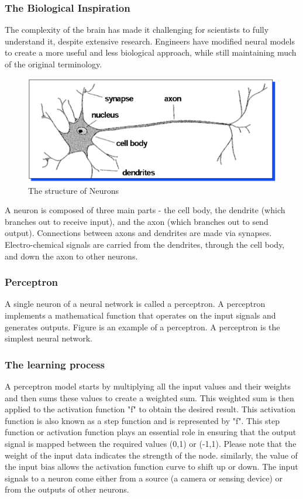 \subsubsection{The Biological Inspiration}
The complexity of the brain has made it challenging for scientists to fully understand it, despite extensive research. Engineers have modified neural models to create a more useful and less biological approach, while still maintaining much of the original terminology.
\begin{figure}[H]
    \centering \includegraphics[width=0.5\linewidth]{tex/img/Structure_of_Neurons.PNG}
    \caption{The structure of Neurons \cite{nielsen2015neural}}
    \label{fig:Neuron structure}
\end{figure}
A neuron is composed of three main parts - the cell body, the dendrite (which branches out to receive input), and the axon (which branches out to send output). Connections between axons and dendrites are made via synapses. Electro-chemical signals are carried from the dendrites, through the cell body, and down the axon to other neurons.


\subsubsection{Perceptron}
A single neuron of a neural network is called a perceptron. A perceptron implements a mathematical function that operates on the input signals and generates outputs. Figure is an example of a perceptron. A perceptron is the simplest neural network.
\subsubsection{The learning process}
A perceptron model starts by multiplying all the input values and their weights and then sums these values to create a weighted sum. This weighted sum is then applied to the activation function "f" to obtain the desired result. This activation function is also known as a step function and is represented by "f". This step function or activation function plays an essential role in ensuring that the output signal is mapped between the required values (0,1) or (-1,1). Please note that the weight of the input data indicates the strength of the node. similarly, the value of the input bias allows the activation function curve to shift up or down.
The input signals to a neuron come either from a source (a camera or sensing device) or from the outputs of other neurons.

